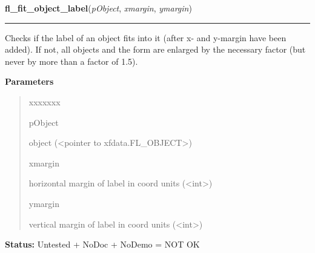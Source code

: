 \hspace{.8\funcindent}\begin{boxedminipage}{\funcwidth}

    \raggedright \textbf{fl\_fit\_object\_label}(\textit{pObject}, \textit{xmargin}, \textit{ymargin})

    \vspace{-1.5ex}

    \rule{\textwidth}{0.5\fboxrule}
\setlength{\parskip}{2ex}
    Checks if the label of an object fits into it (after x- and y-margin 
    have been added). If not, all objects and the form are enlarged by the 
    necessary factor (but never by more than a factor of 1.5).

\setlength{\parskip}{1ex}
      \textbf{Parameters}
      \vspace{-1ex}

      \begin{quote}
        \begin{Ventry}{xxxxxxx}

          \item[pObject]

          object ({\textless}pointer to xfdata.FL\_OBJECT{\textgreater})

          \item[xmargin]

          horizontal margin of label in coord units 
          ({\textless}int{\textgreater})

          \item[ymargin]

          vertical margin of label in coord units 
          ({\textless}int{\textgreater})

        \end{Ventry}

      \end{quote}

\textbf{Status:} Untested + NoDoc + NoDemo = NOT OK



    \end{boxedminipage}

    \label{xformslib:library:fl_get_object_geometry}

    \vspace{0.5ex}

